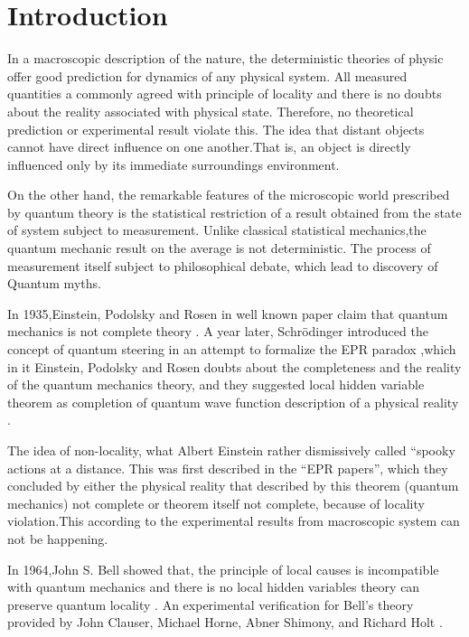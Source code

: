 \chapter{Introduction}
In a macroscopic description of the nature, the deterministic theories of physic offer good prediction for dynamics of any physical system.
All measured quantities a commonly agreed with principle of locality and there is no doubts about the reality associated with physical state. Therefore, no theoretical prediction or experimental result violate this. The idea that distant objects cannot have direct influence on one another.That is, an object is directly influenced only by its immediate surroundings environment.

On the other hand, the remarkable features of the microscopic world prescribed by quantum theory is the statistical restriction of a result obtained from the state of system subject to measurement. Unlike classical statistical mechanics,the quantum mechanic result on the average is not deterministic.
The process of measurement itself subject to philosophical debate, which lead to discovery of Quantum myths.

In 1935,Einstein, Podolsky and Rosen in well known paper claim that quantum  mechanics is not complete theory \citep*{EPR}.
A year later, Schrödinger introduced the concept of quantum steering in an attempt to formalize the EPR paradox \citep*{schrodinger1935discussion},which in it Einstein, Podolsky and Rosen doubts about the completeness and the reality of the quantum mechanics theory, and they suggested local hidden variable theorem as completion of quantum wave function description of a physical reality \citep*{EPR}.
 
The idea of non-locality, what Albert Einstein rather dismissively called “spooky actions at a distance. This was first described in the “EPR papers”\citep*{EPR}, which they concluded by either the physical reality that described by this theorem (quantum mechanics) not complete or theorem itself not complete, because of locality violation.This according to the experimental results from  macroscopic system can not be happening. 

In 1964,John S. Bell showed that, the principle of local causes is incompatible with quantum mechanics and there is no local hidden variables theory can preserve quantum locality \citep*{book:800289}. An experimental verification for Bell's theory provided by John Clauser, Michael Horne, Abner Shimony, and Richard Holt \cite*{PhysRevLett.23.880}.

